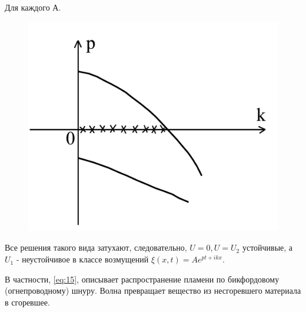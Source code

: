Для каждого А.
\begin{figure}[H]
	\centering
	\includegraphics[width=0.5\linewidth]{fig/fig7.pdf}   
\end{figure}

Все решения такого вида затухают, следовательно, $U=0, U=U_2$ устойчивые, а $U_1$ - неустойчивое в классе возмущений $\xi(x,t)=A e^{pt+ikx}$.

В частности, \eqref{eq:15}, описывает распространение пламени по бикфордовому (огнепроводному) шнуру. Волна превращает вещество из несгоревшего материала в сгоревшее.
